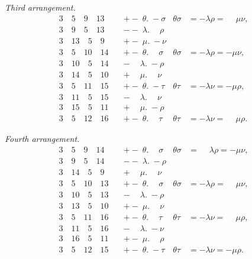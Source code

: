 \documentclass[11pt,a4paper]{book}
\begin{document}
\newpage
\textit{Third arrangement.}
\begin{align*}
3\quad 5\quad 9\quad 13\quad &+ -\; \theta.\; -\sigma & \theta\sigma &= -\lambda\rho = \phantom{-}\mu\nu, \\
3\quad 9\quad 5\quad 13\quad &--\; \lambda.\phantom{-}\rho & & \\
3\quad 13\quad 5\quad 9\quad &+ -\; \mu.\; -\nu & & \\[4pt]
3\quad 5\quad 10\quad 14\quad &+ -\; \theta.\phantom{-}\sigma & \theta\sigma &= -\lambda\rho = -\mu\nu, \\
3\quad 10\quad 5\quad 14\quad &-\phantom{-}\lambda.\; -\rho & & \\
3\quad 14\quad 5\quad 10\quad &+\phantom{-}\mu.\phantom{-}\nu & & \\[4pt]
3\quad 5\quad 11\quad 15\quad &+ -\; \theta.\; -\tau & \theta\tau &= -\lambda\nu = -\mu\rho, \\
3\quad 11\quad 5\quad 15\quad &-\phantom{-}\lambda.\phantom{-}\nu & & \\
3\quad 15\quad 5\quad 11\quad &+\phantom{-}\mu.\; -\rho & & \\[4pt]
3\quad 5\quad 12\quad 16\quad &+ -\; \theta.\phantom{-}\tau & \theta\tau &= -\lambda\nu = \phantom{-}\mu\rho.
\end{align*}

\textit{Fourth arrangement.}
\begin{align*}
3\quad 5\quad 9\quad 14\quad &+ -\; \theta.\phantom{-}\sigma & \theta\sigma &= \phantom{-}\lambda\rho = -\mu\nu, \\
3\quad 9\quad 5\quad 14\quad &--\; \lambda.\; -\rho & & \\
3\quad 14\quad 5\quad 9\quad &+\phantom{-}\mu.\phantom{-}\nu & & \\[4pt]
3\quad 5\quad 10\quad 13\quad &+ -\; \theta.\phantom{-}\sigma & \theta\sigma &= -\lambda\rho = \phantom{-}\mu\nu, \\
3\quad 10\quad 5\quad 13\quad &-\phantom{-}\lambda.\; -\rho & & \\
3\quad 13\quad 5\quad 10\quad &+ -\; \mu.\phantom{-}\nu & & \\[4pt]
3\quad 5\quad 11\quad 16\quad &+ -\; \theta.\phantom{-}\tau & \theta\tau &= -\lambda\nu = \phantom{-}\mu\rho, \\
3\quad 11\quad 5\quad 16\quad &-\phantom{-}\lambda.\; -\nu & & \\
3\quad 16\quad 5\quad 11\quad &+ -\; \mu.\phantom{-}\rho & & \\[4pt]
3\quad 5\quad 12\quad 15\quad &+ -\; \theta.\; -\tau & \theta\tau &= -\lambda\nu = -\mu\rho.
\end{align*}
\end{document}
